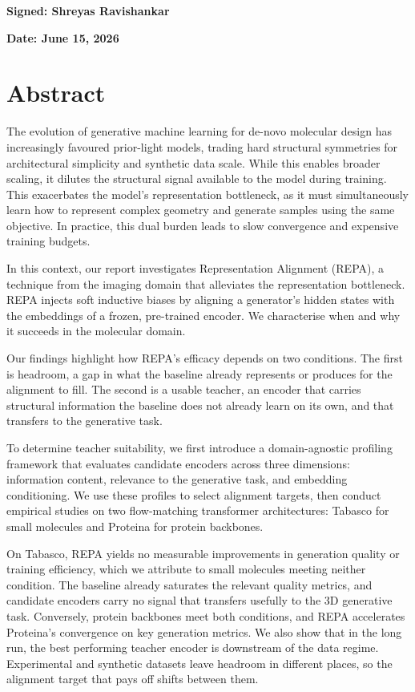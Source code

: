 \documentclass[12pt,a4paper,twoside]{report}
\newif\ifsubmission %
\begin{document}


\ifsubmission\else
\bigskip
\textbf{Signed: Shreyas Ravishankar}
\fi

\bigskip
\textbf{Date: June 15, 2026}
\vspace{\fill}

\chapter*{Abstract}
The evolution of generative machine learning for de-novo molecular design has increasingly favoured prior-light models, trading hard structural symmetries for architectural simplicity and synthetic data scale. While this enables broader scaling, it dilutes the structural signal available to the model during training. This exacerbates the model's representation bottleneck, as it must simultaneously learn how to represent complex geometry and generate samples using the same objective. In practice, this dual burden leads to slow convergence and expensive training budgets.

In this context, our report investigates Representation Alignment (REPA), a technique from the imaging domain that alleviates the representation bottleneck. REPA injects soft inductive biases by aligning a generator's hidden states with the embeddings of a frozen, pre-trained encoder. We characterise when and why it succeeds in the molecular domain.

Our findings highlight how REPA's efficacy depends on two conditions. The first is headroom, a gap in what the baseline already represents or produces for the alignment to fill. The second is a usable teacher, an encoder that carries structural information the baseline does not already learn on its own, and that transfers to the generative task.

To determine teacher suitability, we first introduce a domain-agnostic profiling framework that evaluates candidate encoders across three dimensions: information content, relevance to the generative task, and embedding conditioning. We use these profiles to select alignment targets, then conduct empirical studies on two flow-matching transformer architectures: Tabasco for small molecules and Proteina for protein backbones.

On Tabasco, REPA yields no measurable improvements in generation quality or training efficiency, which we attribute to small molecules meeting neither condition. The baseline already saturates the relevant quality metrics, and candidate encoders carry no signal that transfers usefully to the 3D generative task. Conversely, protein backbones meet both conditions, and REPA accelerates Proteina's convergence on key generation metrics. We also show that in the long run, the best performing teacher encoder is downstream of the data regime. Experimental and synthetic datasets leave headroom in different places, so the alignment target that pays off shifts between them.
\end{document}
